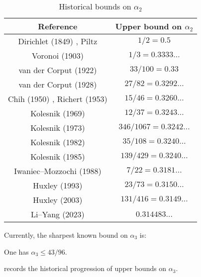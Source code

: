 \begin{table}[ht]
    \def\arraystretch{1.2}
    \centering
    \caption{Historical bounds on $\alpha_2$}
    \begin{tabular}{|c|c|}
    \hline
    Reference & Upper bound on $\alpha_2$\\
    \hline
    Dirichlet (1849) \cite{}, Piltz \cite{} & $1/2 = 0.5$\\
    \hline
    Voronoi (1903) \cite{voronoi_sur_1903} & $1/3 = 0.3333\ldots$\\
    \hline
    van der Corput (1922) \cite{van_der_corput_verscharfung_1922} & $33/100 = 0.33$\\
    \hline
    van der Corput (1928) \cite{van_der_corput_zum_1928} & $27/82 = 0.3292\ldots$\\
    \hline 
    Chih (1950) \cite{chih_on_1950}, Richert (1953) \cite{richert_verschrfung_1953} & $15/46 = 0.3260\ldots$\\
    \hline 
    Kolesnik (1969) \cite{kolesnik_improvement_1969} & $12/37 = 0.3243\ldots$\\
    \hline 
    Kolesnik (1973) \cite{kolesnik_1973} & $346/1067 = 0.3242\ldots$\\
    \hline 
    Kolesnik (1982) \cite{kolesnik_order_1982} & $35/108 = 0.3240\ldots$\\
    \hline 
    Kolesnik (1985) \cite[p. 118]{kolesnik_1985} & $139/429 = 0.3240\ldots$\\
    \hline
    Iwaniec--Mozzochi (1988) \cite{iwaniec_divisor_1988} & $7/22 = 0.3181\ldots$\\
    \hline
    Huxley (1993) \cite{huxley_exponential_1993} & $23/73 = 0.3150\ldots$\\
    \hline
    Huxley (2003) \cite{huxley_exponential_2003} & $131/416 = 0.3149\ldots$\\
    \hline 
    Li--Yang (2023) \cite{li_yang_gauss_2024} & $0.314483\ldots$\\
    \hline 
    \end{tabular}
\label{div-alpha2-table}
\end{table}

Currently, the sharpest known bound on $\alpha_3$ is:

\begin{theorem}\label{divisor-kolesnik}\cite{kolesnik} One has $\alpha_3 \leq 43/96$.
\end{theorem}

 records the historical progression of upper bounds on $\alpha_3$.

